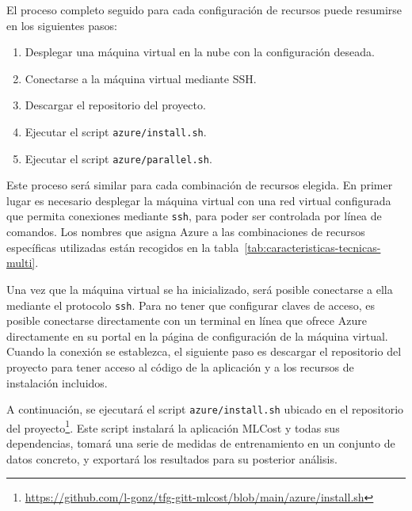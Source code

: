 El proceso completo seguido para cada configuración de recursos puede resumirse en los siguientes pasos:
\begin{enumerate}
    \item Desplegar una máquina virtual en la nube con la configuración deseada.
    \item Conectarse a la máquina virtual mediante SSH.
    \item Descargar el repositorio del proyecto.
    \item Ejecutar el script \texttt{azure/install.sh}.
    \item Ejecutar el script \texttt{azure/parallel.sh}.
\end{enumerate}

Este proceso será similar para cada combinación de recursos elegida. En primer lugar es necesario desplegar la máquina virtual con una red virtual configurada que permita conexiones mediante \texttt{ssh}, para poder ser controlada por línea de comandos. Los nombres que asigna Azure a las combinaciones de recursos específicas utilizadas están recogidos en la tabla~\ref{tab:caracteristicas-tecnicas-multi}.

Una vez que la máquina virtual se ha inicializado, será posible conectarse a ella mediante el protocolo \texttt{ssh}. Para no tener que configurar claves de acceso, es posible conectarse directamente con un terminal en línea que ofrece Azure directamente en su portal en la página de configuración de la máquina virtual. Cuando la conexión se establezca, el siguiente paso es descargar el repositorio del proyecto para tener acceso al código de la aplicación y a los recursos de instalación incluidos.


A continuación, se ejecutará el script \texttt{azure/install.sh} ubicado en el repositorio del proyecto\footnote{\url{https://github.com/l-gonz/tfg-gitt-mlcost/blob/main/azure/install.sh}}. Este script instalará la aplicación MLCost y todas sus dependencias, tomará una serie de medidas de entrenamiento en un conjunto de datos concreto, y exportará los resultados para su posterior análisis.



